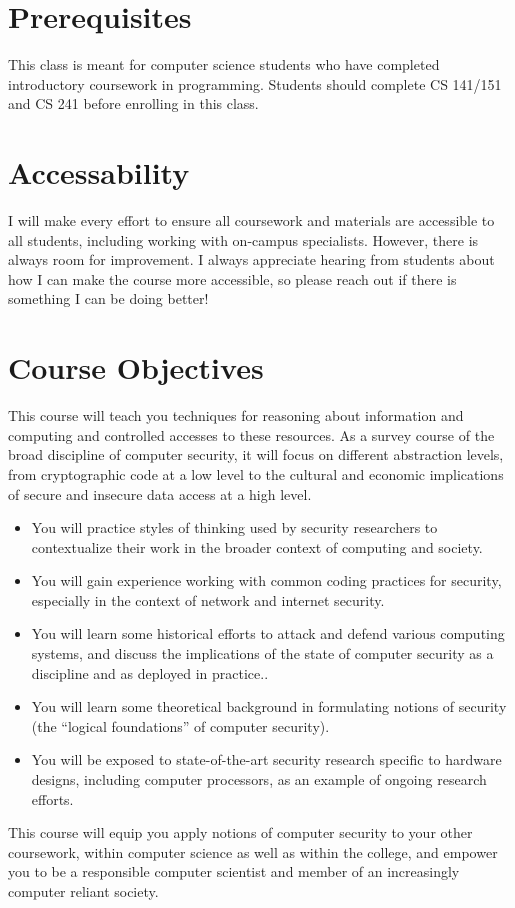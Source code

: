 \documentclass[11pt]{article}
\begin{document}

\section*{Prerequisites}

This class is meant for computer science students who have completed introductory coursework in programming.  Students should complete CS 141/151 and CS 241 before enrolling in this class.

\section*{Accessability}

I will make every effort to ensure all coursework and materials are accessible to all students, including working with on-campus specialists. However, there is always room for improvement. I always appreciate hearing from students about how I can make the course more accessible, so please reach out if there is something I can be doing better!


\section*{Course Objectives}
This course will teach you techniques for reasoning about information and computing and controlled accesses to these resources. As a survey course of the broad discipline of computer security, it will focus on different abstraction levels, from cryptographic code at a low level to the cultural and economic implications of secure and insecure data access at a high level.
\begin{itemize}
\item You will practice styles of thinking used by security researchers to contextualize their work in the broader context of computing and society.
\item You will gain experience working with common coding practices for security, especially in the context of network and internet security.
\item You will learn some historical efforts to attack and defend various computing systems, and discuss the implications of the state of computer security as a discipline and as deployed in practice..
\item You will learn some theoretical background in formulating notions of security (the ``logical foundations'' of computer security).
\item You will be exposed to state-of-the-art security research specific to hardware designs, including computer processors, as an example of ongoing research efforts.
\end{itemize}
This course will equip you apply notions of computer security to your other coursework, within computer science as well as within the college, and empower you to be a responsible computer scientist and member of an increasingly computer reliant society.
\end{document}
